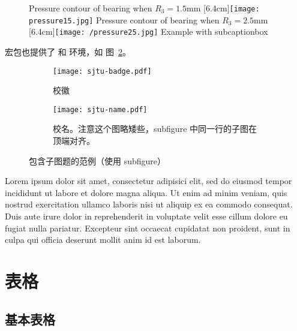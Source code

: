 \begin{figure}[!hbtp]
  \centering
                  {Pressure contour of bearing when $R_3 = 1.5\text{mm}$}%
                  [6.4cm]{\texttt{[image: pressure15.jpg]}}
  \hspace{1cm}
                  {Pressure contour of bearing when $R_3 = 2.5\text{mm}$}%
                  [6.4cm]{\texttt{[image: /pressure25.jpg]}}
            {Example with subcaptionbox}
  \label{fig:bisubcaptionbox}
\end{figure}

 宏包也提供了  和  环境，如
图~\ref{fig:subfigure}。

\begin{figure}[!htp]
  \centering
  \begin{subfigure}{0.3\textwidth}
    \centering
    \texttt{[image: sjtu-badge.pdf]}
    \caption{校徽}
  \end{subfigure}
  \hspace{1cm}
  \begin{subfigure}{0.4\textwidth}
    \centering
    \texttt{[image: sjtu-name.pdf]}
    \caption{校名。注意这个图略矮些，subfigure 中同一行的子图在顶端对齐。}
  \end{subfigure}
  \caption{包含子图题的范例（使用 subfigure）}
  \label{fig:subfigure}
\end{figure}

Lorem ipsum dolor sit amet, consectetur adipisici elit, sed do eiusmod tempor
incididunt ut labore et dolore magna aliqua. Ut enim ad minim veniam, quis
nostrud exercitation ullamco laboris nisi ut aliquip ex ea commodo consequat.
Duis aute irure dolor in reprehenderit in voluptate velit esse cillum dolore eu
fugiat nulla pariatur. Excepteur sint occaecat cupidatat non proident, sunt in
culpa qui officia deserunt mollit anim id est laborum.

\section{表格}

\subsection{基本表格}

